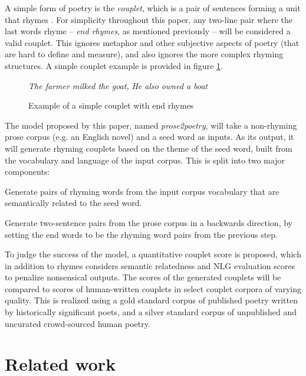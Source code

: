 \documentclass[11pt,a4paper]{article}
\newenvironment{tight_enumerate}{
\begin{enumerate}
\setlength{\itemsep}{0pt}
\setlength{\parskip}{0pt}
}{\end{enumerate}}
\begin{document}
A simple form of poetry is the \textit{couplet}, which is a pair of sentences forming a unit that rhymes \cite{couplet_def}. For simplicity throughout this paper, any two-line pair where the last words rhyme -- \textit{end rhymes}, as mentioned previously -- will be considered a valid couplet. This ignores metaphor and other subjective aspects of poetry (that are hard to define and measure), and also ignores the more complex rhyming structures. A simple couplet example is provided in figure \ref{fig:couplet_example}.

\begin{figure}
	\textit{The farmer milked the goat,} \newline
	\textit{He also owned a boat}
\caption{Example of a simple couplet with end rhymes}
\label{fig:couplet_example}
\end{figure}

The model proposed by this paper, named \textit{prose2poetry}, will take a non-rhyming prose corpus (e.g. an English novel) and a seed word as inputs. As its output, it will generate rhyming couplets based on the theme of the seed word, built from the vocabulary and language of the input corpus. This is split into two major components:
\begin{tight_enumerate}
	\vspace{-0.5em}
	\item
		Generate pairs of rhyming words from the input corpus vocabulary that are semantically related to the seed word.
	\item
		Generate two-sentence pairs from the prose corpus in a backwards direction, by setting the end words to be the rhyming word pairs from the previous step.
\end{tight_enumerate}
\vspace{-0.5em}

To judge the success of the model, a quantitative couplet score is proposed, which in addition to rhymes considers semantic relatedness and NLG evaluation scores to penalize nonsensical outputs. The scores of the generated couplets will be compared to scores of human-written couplets in select couplet corpora of varying quality. This is realized using a gold standard corpus of published poetry written by historically significant poets, and a silver standard corpus of unpublished and uncurated crowd-sourced human poetry.

\section{Related work}
\label{sec:related}
\end{document}

